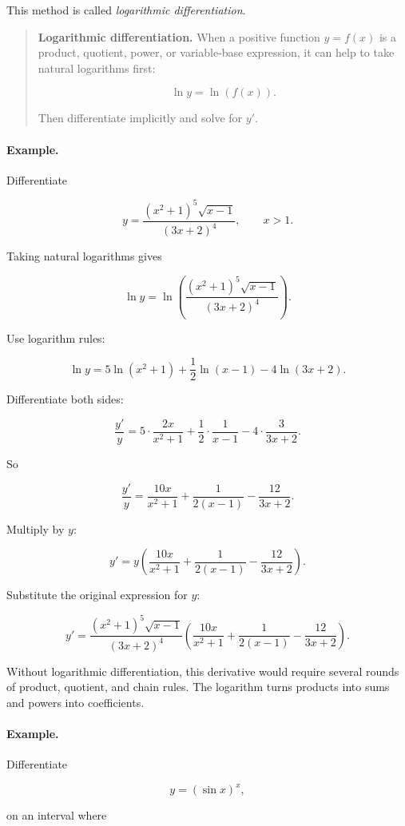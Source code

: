 This method is called \emph{logarithmic differentiation}.

\begin{quote}
\textbf{Logarithmic differentiation.}
When a positive function \(y=f(x)\) is a product, quotient, power, or variable-base expression, it can help to take natural logarithms first:

\[
\ln y=\ln(f(x)).
\]

Then differentiate implicitly and solve for \(y'\).
\end{quote}

\paragraph{Example.}
Differentiate

\[
y=\frac{(x^2+1)^5\sqrt{x-1}}{(3x+2)^4},
\qquad x>1.
\]

Taking natural logarithms gives

\[
\ln y
=
\ln\left(\frac{(x^2+1)^5\sqrt{x-1}}{(3x+2)^4}\right).
\]

Use logarithm rules:

\[
\ln y
=
5\ln(x^2+1)+\frac12\ln(x-1)-4\ln(3x+2).
\]

Differentiate both sides:

\[
\frac{y'}{y}
=
5\cdot\frac{2x}{x^2+1}
+
\frac12\cdot\frac1{x-1}
-
4\cdot\frac3{3x+2}.
\]

So

\[
\frac{y'}{y}
=
\frac{10x}{x^2+1}
+
\frac1{2(x-1)}
-
\frac{12}{3x+2}.
\]

Multiply by \(y\):

\[
y'
=
y\left(
\frac{10x}{x^2+1}
+
\frac1{2(x-1)}
-
\frac{12}{3x+2}
\right).
\]

Substitute the original expression for \(y\):

\[
\boxed{
y'
=
\frac{(x^2+1)^5\sqrt{x-1}}{(3x+2)^4}
\left(
\frac{10x}{x^2+1}
+
\frac1{2(x-1)}
-
\frac{12}{3x+2}
\right).
}
\]

Without logarithmic differentiation, this derivative would require several rounds of product, quotient, and chain rules.  The logarithm turns products into sums and powers into coefficients.

\paragraph{Example.}
Differentiate

\[
y=(\sin x)^x,
\]

on an interval where


